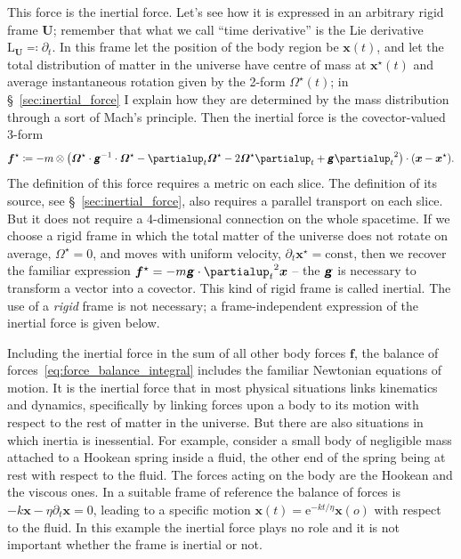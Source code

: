 \documentclass[\ifafour a4paper,12pt,\else a5paper,10pt,\fi%
onecolumn,oneside,article,%
british%
]{memoir}
\theoremstyle{remark}
\theoremstyle{innote}
\newcommand*{\mathte}[1]{\textbf{\textit{\textsf{#1}}}}
\newcommand*{\de}{\partialup}%
\newcommand*{\e}{\mathrm{e}}%
\newcommand*{\defd}{\coloneqq}
\newcommand*{\defs}{\eqqcolon}
\renewcommand*{\|}{\nonscript\,\vert\nonscript\;\mathopen{}}
\newcommand*{\sect}{\S}%
\newcommand*{\Li}{\mathrm{L}}
\newcommand*{\ydd}{m}
\newcommand*{\yd}{\ydd}
\newcommand*{\ybb}{f}
\newcommand*{\yb}{\bm{\ybb}}
\newcommand*{\ybi}{\yb^{\mathord{\star}}}
\newcommand*{\yxxt}{x}
\newcommand*{\yxt}{\bm{\yxxt}}
\newcommand*{\yxto}{\bm{\yxxt}^{\mathord{\star}}}
\newcommand*{\yomm}{\varOmega}
\newcommand*{\yom}{\bm{\yomm}^{\mathord{\star}}}
\newcommand*{\yFF}{U}
\newcommand*{\yF}{\bm{\yFF}}
\newcommand*{\ygg}{g}
\newcommand*{\yg}{\mathte{\ygg}}
\begin{document}
This force is the inertial force. Let's see how it is expressed in an
arbitrary rigid frame $\yF$; remember that what we call \enquote{time
  derivative} is the Lie derivative $\Li_{\yF} \defs \de_t$. In this frame
let the position of the body region be $\yxt(t)$, and let the total
distribution of matter in the universe have centre of mass at $\yxto(t)$
and average instantaneous rotation given by the 2-form $\yom(t)$; in
\sect~\ref{sec:inertial_force} I explain how they are determined by the
mass distribution through a sort of Mach's principle. Then the inertial
force is the covector-valued 3-form
\begin{equation}
  \label{eq:inertial_force}
  \ybi \defd  -\yd \otimes
  \bigl(\yom\cdot\yg^{-1}\cdot\yom  - \de_t\yom - 2\yom\de_t  + \yg{\de_t}^2\bigr)
  \cdot(\yxt-\yxto).
\end{equation}
The definition of this force requires a metric on each slice. The definition
of its source, see \sect~\ref{sec:inertial_force}, also requires a parallel
transport on each slice. But it does not require a 4-dimensional connection
on the whole spacetime. If we choose a rigid frame in which the total
matter of the universe does not rotate on average, $\yom=0$, and moves with
uniform velocity, $\de_t\yxto=\text{const}$, then we recover the familiar
expression $\ybi = -\yd \yg\cdot{\de_t}^2\yxt$ -- the $\yg$ is necessary to
transform a vector into a covector. This kind of rigid frame is called
inertial. The use of a \emph{rigid} frame is not necessary; a
frame-independent expression of the inertial force is given below.

Including the inertial force in the sum of all other body forces $\yb$, the
balance of forces~\eqref{eq:force_balance_integral} includes the familiar
Newtonian equations of motion. It is the inertial force that in most
physical situations links kinematics and dynamics, specifically by linking
forces upon a body to its motion with respect to the rest of matter in the
universe. But there are also situations in which inertia is inessential.
For example, consider a small body of negligible mass attached to a Hookean
spring inside a fluid, the other end of the spring being at rest with
respect to the fluid. The forces acting on the body are the Hookean and the
viscous ones. In a suitable frame of reference the balance of forces is
$-k\yxt - \eta\de_t\yxt = 0$, leading to a specific motion
$\yxt(t) = \e^{-kt/\eta}\yxt(o)$ with respect to the fluid. In this example
the inertial force plays no role and it is not important whether the frame
is inertial or not.
\end{document}
